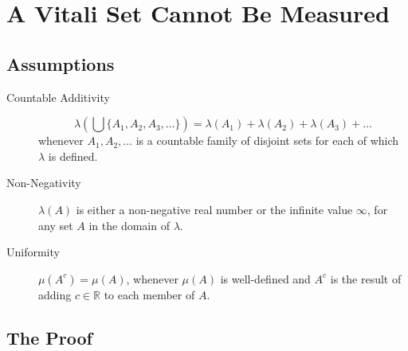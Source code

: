 \documentclass[12pt]{extarticle}
\begin{document}
\section{A Vitali Set Cannot Be Measured}

\subsection{Assumptions}

\begin{description}


\item[Countable Additivity]
\[\lambda\left(\bigcup\{A_1,  A_2 , A_3,\ldots\}\right) = \lambda(A_1) + \lambda(A_2) + \lambda(A_3) + \ldots\] whenever $A_1,A_2,\dots$ is a countable family of disjoint sets for each of which $\lambda$ is defined.\label{gloss:count-add-measure}



\item[Non-Negativity]
$\lambda(A)$ is either a non-negative real number or the infinite value $\infty$, for any set $A$ in the domain of $\lambda$.\label{gloss:non-neg}


\item[Uniformity]
$\mu(A^c) = \mu(A)$, whenever $\mu(A)$ is well-defined and $A^c$ is the result of adding $c \in \mathbb{R}$ to each member of $A$.\label{gloss:uniformity}
\end{description}

\subsection{The Proof}
\end{document}
